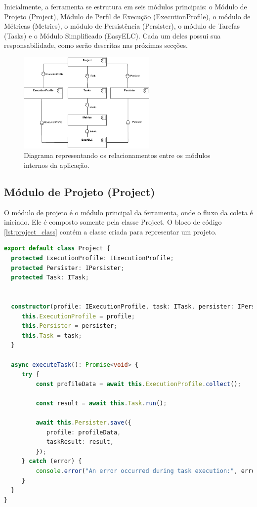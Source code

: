 \documentclass[12pt]{tcc}
\begin{document}
Inicialmente, a ferramenta se estrutura em seis módulos principais: o Módulo de Projeto (Project), Módulo de Perfil de Execução (ExecutionProfile), o módulo de Métricas (Metrics), o módulo de Persistência (Persister), o módulo de Tarefas (Tasks) e o Módulo Simplificado (EasyELC). Cada um deles possui sua responsabilidade, como serão descritas nas próximas secções. 

\begin{figure}[!ht]
	\centering
	\includegraphics[width=0.6\textwidth]{figures/diagramaarquiteturaelchupacabra.pdf}
	\caption{Diagrama representando os relacionamentos entre os módulos internos da aplicação.}
	\label{fig:diagrama-arquitetura}
\end{figure}


\subsection{Módulo de Projeto (Project)}
\label{subsection:modulo-project}

O módulo de projeto é o módulo principal da ferramenta, onde o fluxo da coleta é iniciado. Ele é composto somente pela classe Project. O bloco de código \ref{lst:project_class} contém a classe criada para representar um projeto.

\begin{lstlisting}[label={lst:project_class}, caption={Implementação da classe responsável por representar um projeto.}, language=TypeScript, breaklines=true]
export default class Project {
  protected ExecutionProfile: IExecutionProfile;
  protected Persister: IPersister;
  protected Task: ITask;


  constructor(profile: IExecutionProfile, task: ITask, persister: IPersister) {
     this.ExecutionProfile = profile;
     this.Persister = persister;
     this.Task = task;
  }

  async executeTask(): Promise<void> {
     try {
         const profileData = await this.ExecutionProfile.collect();

         const result = await this.Task.run();

         await this.Persister.save({
            profile: profileData,
            taskResult: result,
         });
     } catch (error) {
         console.error("An error occurred during task execution:", error);
     }
  }
}
\end{lstlisting}
\end{document}
